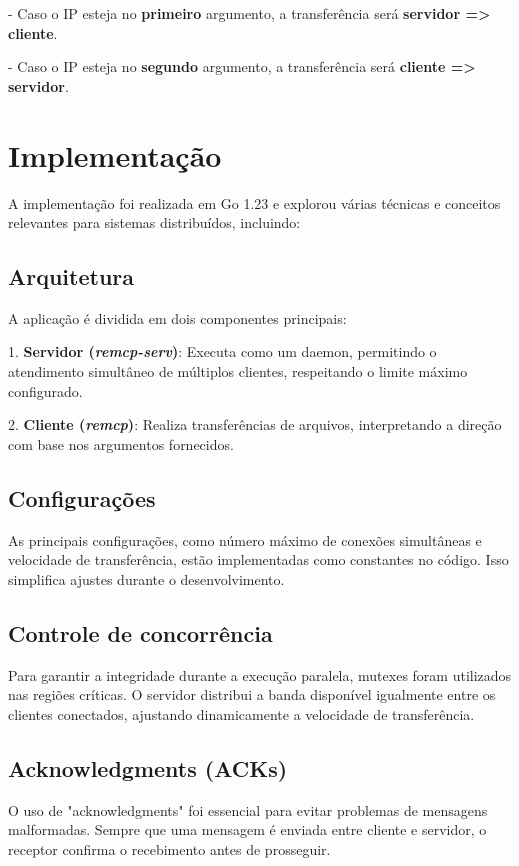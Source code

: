 \documentclass{article}
\begin{document}
- Caso o IP esteja no \textbf{primeiro} argumento, a transferência será \textbf{servidor => cliente}.

- Caso o IP esteja no \textbf{segundo} argumento, a transferência será \textbf{cliente => servidor}.

\section*{Implementação}

A implementação foi realizada em Go 1.23 e explorou várias técnicas e conceitos relevantes para sistemas distribuídos, incluindo:

\subsection*{Arquitetura}
A aplicação é dividida em dois componentes principais:

1. \textbf{Servidor (\textit{remcp-serv})}: Executa como um daemon, permitindo o atendimento simultâneo de múltiplos clientes, respeitando o limite máximo configurado.

2. \textbf{Cliente (\textit{remcp})}: Realiza transferências de arquivos, interpretando a direção com base nos argumentos fornecidos.

\subsection*{Configurações}
As principais configurações, como número máximo de conexões simultâneas e velocidade de transferência, estão implementadas como constantes no código.
Isso simplifica ajustes durante o desenvolvimento.

\subsection*{Controle de concorrência}
Para garantir a integridade durante a execução paralela, mutexes foram utilizados nas regiões críticas. O servidor distribui a banda disponível
igualmente entre os clientes conectados, ajustando dinamicamente a velocidade de transferência.

\subsection*{Acknowledgments (ACKs)}
O uso de "acknowledgments" foi essencial para evitar problemas de mensagens malformadas. Sempre que uma mensagem é enviada entre cliente e servidor,
o receptor confirma o recebimento antes de prosseguir.
\end{document}
